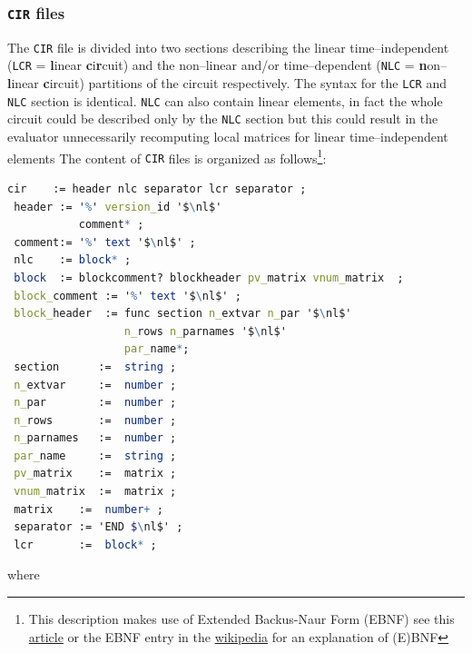 \documentclass{scrartcl}
\newcommand{\nlc}{{\tt NLC}}
\newcommand{\cir}{{\tt CIR}}
\newcommand{\lcr}{{\tt LCR}}
\newcommand{\nl}{{\tt \backslash n}}
\begin{document}
\subsubsection{{\cir} files}
The {\cir} file is divided into two sections describing the linear 
time--independent ({\lcr} = {\bf l}inear {\bf c}i{\bf r}cuit) and the 
non--linear and/or time--dependent  ({\nlc} = {\bf n}on--{\bf l}inear 
{\bf c}ircuit) partitions of the circuit respectively. 
The syntax for the {\lcr} and {\nlc} section is identical. 
{\nlc} can also contain linear elements, in fact the whole circuit could be 
described only by the {\nlc} 
section but this could result in the evaluator unnecessarily recomputing local 
matrices for linear 
time--independent elements
The content of {\cir} files is organized as follows\footnote{ This description 
makes use of Extended Backus-Naur Form (EBNF) see this 
\hyperref{http://www.garshol.priv.no/download/text/bnf.html}{}{}{article} 
or the EBNF entry in the \hyperref{http://en.wikipedia.org}{}{}{wikipedia} 
for an explanation of (E)BNF }:

\begin{lstlisting}[language=Mathematica,mathescape=true,backgroundcolor={}]
 cir    := header nlc separator lcr separator ;
 header := '%' version_id '$\nl$' 
           comment* ;
 comment:= '%' text '$\nl$' ;
 nlc    := block* ;
 block  := blockcomment? blockheader pv_matrix vnum_matrix  ;
 block_comment := '%' text '$\nl$' ;
 block_header  := func section n_extvar n_par '$\nl$'  
                  n_rows n_parnames '$\nl$' 
                  par_name*;
 section      :=  string ; 
 n_extvar     :=  number ; 
 n_par        :=  number ; 
 n_rows       :=  number ;
 n_parnames   :=  number ;
 par_name     :=  string ; 
 pv_matrix    :=  matrix ;
 vnum_matrix  :=  matrix ;
 matrix    :=  number+ ; 
 separator := 'END $\nl$' ; 
 lcr       :=  block* ; 
\end{lstlisting}

where
\end{document}
